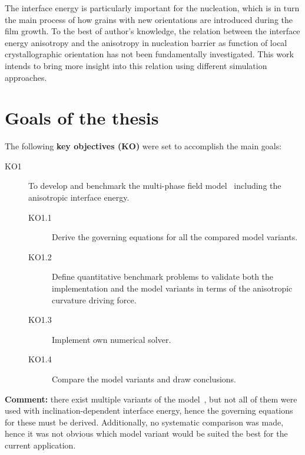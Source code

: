 The interface energy is particularly important for the nucleation, which is in turn the main process of how grains with new orientations are introduced during the film growth. To the best of author's knowledge, the relation between the interface energy anisotropy and the anisotropy in nucleation barrier as function of local crystallographic orientation has not been fundamentally investigated. This work intends to bring more insight into this relation using different simulation approaches.



\section{Goals of the thesis}

\noindent{}


The following \textbf{key objectives (KO)} were set to accomplish the main goals:
\begin{description}
	\item[KO1] To develop and benchmark the multi-phase field model~\cite{Moelans2008} including the anisotropic interface energy.
	\begin{description}
		\item[KO1.1] Derive the governing equations for all the compared model variants.
		\item[KO1.2] Define quantitative benchmark problems to validate both the implementation and the model variants in terms of the anisotropic curvature driving force.
		\item[KO1.3] Implement own numerical solver.
		\item[KO1.4] Compare the model variants and draw conclusions.
	\end{description}
\end{description}
\noindent\textbf{Comment:} there exist multiple variants of the model~\cite{Moelans2008}, but not all of them were used with inclination-dependent interface energy, hence the governing equations for these must be derived. Additionally, no systematic comparison was made, hence it was not obvious which model variant would be suited the best for the current application.

